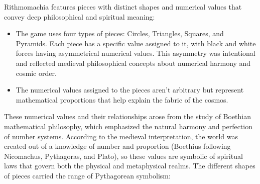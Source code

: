 \documentclass[14pt]{extarticle}
\begin{document}
Rithmomachia features pieces with distinct shapes and numerical values
that convey deep philosophical and spiritual meaning:
\begin{itemize}
\item
The game uses four types of pieces: Circles, Triangles, Squares, and Pyramids.
Each piece has a specific value assigned to it, with black and white
forces having asymmetrical numerical values. This asymmetry was
intentional and reflected medieval philosophical concepts about
numerical harmony and cosmic order.

\item
The numerical values assigned to the pieces aren't arbitrary but represent
mathematical proportions that help explain the fabric of the cosmos.
\end{itemize}
These numerical values and their relationships arose from the
study of Boethian mathematical philosophy, which emphasized the natural
harmony and perfection of number systems.
According to the medieval interpretation,
the world was created out of a knowledge of number and proportion
(Boethius following Nicomachus, Pythagoras, and Plato),
so these values are symbolic of spiritual laws that govern both
the physical and metaphysical realms.
The different shapes of pieces carried the range of Pythagorean symbolism:
\end{document}
